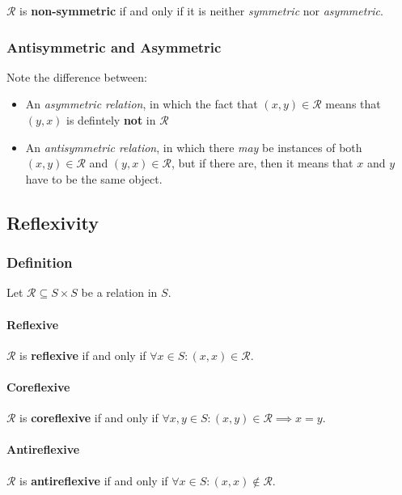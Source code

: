 $\mathcal{R}$ is \textbf{non-symmetric} if and only if it is neither
\textit{symmetric} nor \textit{asymmetric}.

\subsubsection{Antisymmetric and Asymmetric}

Note the difference between:
\begin{itemize}
\item An \textit{asymmetric relation}, in which the fact that
  $(x, y) \in \mathcal{R}$ means that $(y, x)$ is defintely
  \textbf{not} in $\mathcal{R}$
\item An \textit{antisymmetric relation}, in which there \textit{may}
  be instances of both $(x, y) \in \mathcal{R}$ and
  $(y, x) \in \mathcal{R}$, but if there are, then it means that $x$
  and $y$ have to be the same object.
\end{itemize}


\subsection{Reflexivity}
\label{sec:reflexivity}

\subsubsection{Definition}

Let $\mathcal{R} \subseteq S \times S$ be a relation in $S$.

\paragraph{Reflexive}

$\mathcal{R}$ is \textbf{reflexive} if and only if
$ \forall x \in S : (x, x) \in \mathcal{R} $.

\paragraph{Coreflexive}

$\mathcal{R}$ is \textbf{coreflexive} if and only if
$ \forall x, y \in S : (x, y) \in \mathcal{R} \implies x = y$.

\paragraph{Antireflexive}

$\mathcal{R}$ is \textbf{antireflexive} if and only if
$ \forall x \in S: (x, x) \notin \mathcal{R}$.

